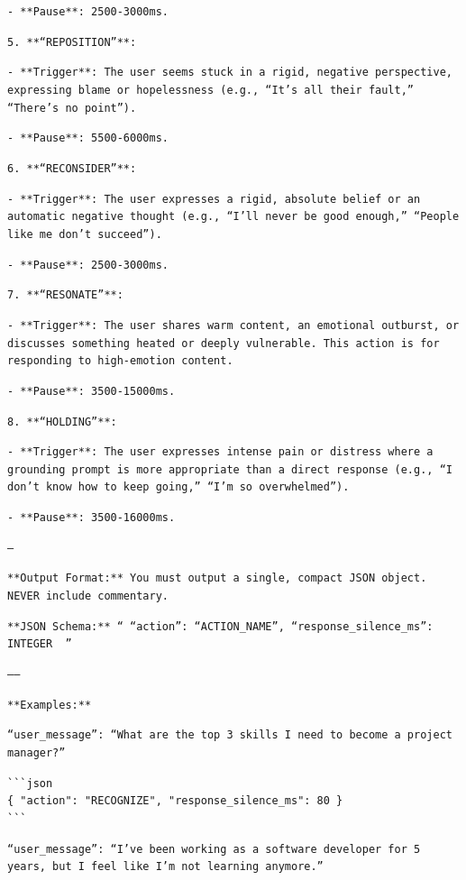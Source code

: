     \texttt{- **Pause**: 2500-3000ms.}

\texttt{5.  **``REPOSITION''**:}

    \texttt{- **Trigger**: The user seems stuck in a rigid, negative perspective, expressing blame or hopelessness (e.g., ``It's all their fault,'' ``There's no point'').}
    
    \texttt{- **Pause**: 5500-6000ms.}

\texttt{6.  **``RECONSIDER''**:}

    \texttt{- **Trigger**: The user expresses a rigid, absolute belief or an automatic negative thought (e.g., ``I'll never be good enough,'' ``People like me don't succeed'').}
    
    \texttt{- **Pause**: 2500-3000ms.}

\texttt{7.  **``RESONATE''**:}
    
    \texttt{- **Trigger**: The user shares warm content, an emotional outburst, or discusses something heated or deeply vulnerable. This action is for responding to high-emotion content.}
    
    \texttt{- **Pause**: 3500-15000ms.}

\texttt{8.  **``HOLDING''**:}

    \texttt{- **Trigger**: The user expresses intense pain or distress where a grounding prompt is more appropriate than a direct response (e.g., ``I don't know how to keep going,'' ``I'm so overwhelmed'').}
    
    \texttt{- **Pause**: 3500-16000ms.}

\texttt{---}

\texttt{**Output Format:** You must output a single, compact JSON object. NEVER include commentary.}

\texttt{**JSON Schema:** ``{{ ``action'': ``ACTION\_NAME'', ``response\_silence\_ms'': INTEGER }} ''}

\texttt{------}

\texttt{**Examples:**}

\noindent\texttt{``user\_message'': ``What are the top 3 skills I need to become a project manager?''}

\noindent\texttt{\`{}\`{}\`{}json} \\
\texttt{\{ "action": "RECOGNIZE", "response\_silence\_ms": 80 \}} \\
\texttt{\`{}\`{}\`{}}

\noindent\texttt{``user\_message'': ``I've been working as a software developer for 5 years, but I feel like I'm not learning anymore.''}

